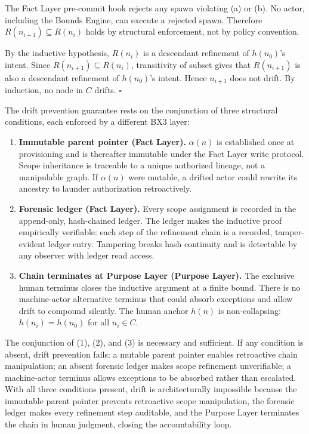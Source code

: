 The Fact Layer pre-commit hook rejects any spawn violating (a) or (b). No actor, including the Bounds Engine, can execute a rejected spawn. Therefore $R(n_{i+1}) \subseteq R(n_i)$ holds by structural enforcement, not by policy convention.

By the inductive hypothesis, $R(n_i)$ is a descendant refinement of $h(n_0)$'s intent. Since $R(n_{i+1}) \subseteq R(n_i)$, transitivity of subset gives that $R(n_{i+1})$ is also a descendant refinement of $h(n_0)$'s intent. Hence $n_{i+1}$ does not drift. By induction, no node in $C$ drifts. $\square$

\medskip
The drift prevention guarantee rests on the conjunction of three structural conditions, each enforced by a different BX3 layer:

\begin{enumerate}
  \item[(1)] \textbf{Immutable parent pointer (Fact Layer).} $\alpha(n)$ is established once at provisioning and is thereafter immutable under the Fact Layer write protocol. Scope inheritance is traceable to a unique authorized lineage, not a manipulable graph. If $\alpha(n)$ were mutable, a drifted actor could rewrite its ancestry to launder authorization retroactively.

  \item[(2)] \textbf{Forensic ledger (Fact Layer).} Every scope assignment is recorded in the append-only, hash-chained ledger. The ledger makes the inductive proof empirically verifiable: each step of the refinement chain is a recorded, tamper-evident ledger entry. Tampering breaks hash continuity and is detectable by any observer with ledger read access.

  \item[(3)] \textbf{Chain terminates at Purpose Layer (Purpose Layer).} The exclusive human terminus closes the inductive argument at a finite bound. There is no machine-actor alternative terminus that could absorb exceptions and allow drift to compound silently. The human anchor $h(n)$ is non-collapsing: $h(n_i) = h(n_0)$ for all $n_i \in C$.
\end{enumerate}

The conjunction of (1), (2), and (3) is necessary and sufficient. If any condition is absent, drift prevention fails: a mutable parent pointer enables retroactive chain manipulation; an absent forensic ledger makes scope refinement unverifiable; a machine-actor terminus allows exceptions to be absorbed rather than escalated. With all three conditions present, drift is architecturally impossible because the immutable parent pointer prevents retroactive scope manipulation, the forensic ledger makes every refinement step auditable, and the Purpose Layer terminates the chain in human judgment, closing the accountability loop.

